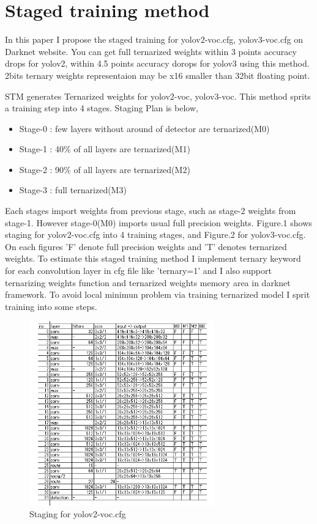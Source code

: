 \documentclass[10pt,a4paper,twocolumn]{article}
\begin{document}
\section{Staged training method}
In this paper I propose the staged training for yolov2-voc.cfg\cite{redmon2016yolo9000}, yolov3-voc.cfg\cite{yolov3} on Darknet website.
You can get full ternarized weights within 3 points accuracy drops for yolov2, within 4.5 points accuracy dorops for yolov3 using this method.
2bits ternary weights representaion may be x16 smaller than 32bit floating point.

STM generates Ternarized weights for yolov2-voc, yolov3-voc.
This method sprits a training step into 4 stages. Staging Plan is below,

\begin{itemize}
\item Stage-0 : few layers without around of detector are ternarized(M0)
\item Stage-1 : 40\% of all layers are ternarized(M1)
\item Stage-2 : 90\% of all layers are ternarized(M2)
\item Stage-3 : full ternarized(M3)
\end{itemize}

Each stages import weights from previous stage, such as stage-2 weights from stage-1.
However stage-0(M0) imports usual full precision weights.
Figure.1 shows staging for yolov2-voc.cfg into 4 training stages, and Figure.2 for yolov3-voc.cfg.
On each figures 'F' denote full precision weights and 'T' denotes ternarized weights.
To estimate this staged training method I implement ternary keyword for each convolution layer in cfg file like 'ternary=1' and I also support ternarizing weights function and ternarized weights memory area in darknet framework.
To avoid local minimun problem via training ternarized model I sprit training into some steps.

\begin{figure}
\includegraphics[width=8cm]{yolov2-voc_Stages.png}
\caption{Staging for yolov2-voc.cfg}
\end{figure}
\end{document}
